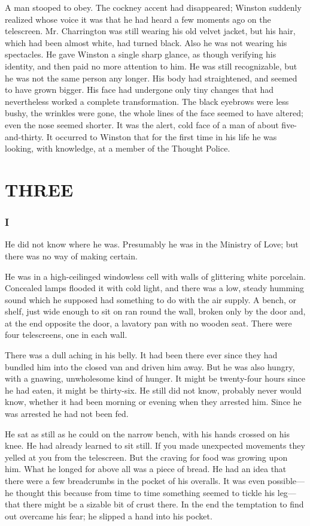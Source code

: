 A man stooped to obey. The cockney accent had disappeared; Winston
suddenly realized whose voice it was that he had heard a few moments ago
on the telescreen. Mr. Charrington was still wearing his old velvet
jacket, but his hair, which had been almost white, had turned black.
Also he was not wearing his spectacles. He gave Winston a single sharp
glance, as though verifying his identity, and then paid no more
attention to him. He was still recognizable, but he was not the same
person any longer. His body had straightened, and seemed to have grown
bigger. His face had undergone only tiny changes that had nevertheless
worked a complete transformation. The black eyebrows were less bushy,
the wrinkles were gone, the whole lines of the face seemed to have
altered; even the nose seemed shorter. It was the alert, cold face of a
man of about five-and-thirty. It occurred to Winston that for the first
time in his life he was looking, with knowledge, at a member of the
Thought Police.

\clearpage
\part{THREE}\label{three}

\section{I}

He did not know where he was. Presumably he was in the Ministry of Love;
but there was no way of making certain.

He was in a high-ceilinged windowless cell with walls of glittering
white porcelain. Concealed lamps flooded it with cold light, and there
was a low, steady humming sound which he supposed had something to do
with the air supply. A bench, or shelf, just wide enough to sit on ran
round the wall, broken only by the door and, at the end opposite the
door, a lavatory pan with no wooden seat. There were four telescreens,
one in each wall.

There was a dull aching in his belly. It had been there ever since they
had bundled him into the closed van and driven him away. But he was also
hungry, with a gnawing, unwholesome kind of hunger. It might be
twenty-four hours since he had eaten, it might be thirty-six. He still
did not know, probably never would know, whether it had been morning or
evening when they arrested him. Since he was arrested he had not been
fed.

He sat as still as he could on the narrow bench, with his hands crossed
on his knee. He had already learned to sit still. If you made unexpected
movements they yelled at you from the telescreen. But the craving for
food was growing upon him. What he longed for above all was a piece of
bread. He had an idea that there were a few breadcrumbs in the pocket of
his overalls. It was even possible---he thought this because from time
to time something seemed to tickle his leg---that there might be a
sizable bit of crust there. In the end the temptation to find out
overcame his fear; he slipped a hand into his pocket.

